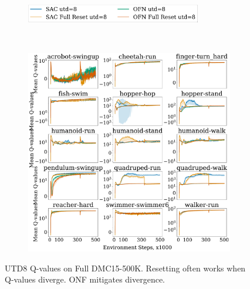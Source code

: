 \begin{figure}[H]
\centering
    \begin{subfigure}[b]{0.8\textwidth}
        \centering
        \includegraphics[height=0.8cm]{figures/dissecting/main_exp/utd_8_Q_legend.pdf}
    \end{subfigure}\\%
    \begin{subfigure}[b]{1\textwidth}
        \centering
        \includegraphics[width=15cm, trim=0cm 0cm 0cm 0cm ,clip]{figures/dissecting/main_exp/utd_8_Q.pdf}
    \end{subfigure}%
    \caption{UTD8 Q-values on Full DMC15-500K. Resetting often works when Q-values diverge. ONF mitigates divergence.}
    \label{fig:utd8_Q}
\end{figure}


